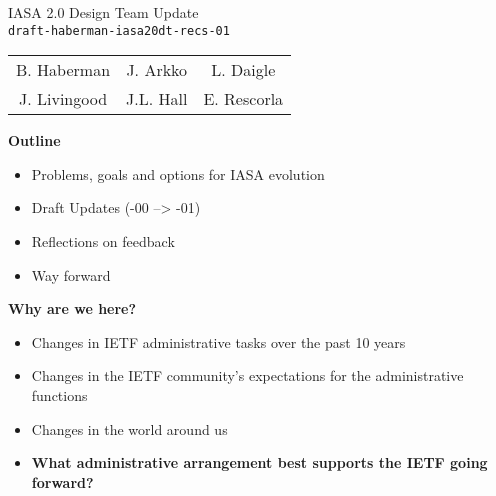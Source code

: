 \documentclass[helvetica,a4paper,landscape]{seminar}
\newcommand{\heading}[1]{%
  \begin{center} 
    \large\bf 
    #1 
  \end{center} 
  \vspace{.4 in}}
\begin{document}
\begin{slide}
\begin{center}
\vspace{.5 in}
\LARGE{{\bf}IASA 2.0 Design Team Update\\{\small \verb^draft-haberman-iasa20dt-recs-01^}}\\
\vspace{.2in}
\large{
\begin{tabular}{ c c c }
B. Haberman & J. Arkko & L. Daigle \\
J. Livingood & J.L. Hall & E. Rescorla 
\end{tabular}
}
\end{center}
\end{slide}

\centerslidesfalse 

\begin{slide}
\heading{Outline}

\begin{itemize}
\item Problems, goals and options for IASA evolution
\item Draft Updates (-00 --> -01)
\item Reflections on feedback
\item Way forward
\end{itemize}

\end{slide}

\begin{slide}

\heading{Why are we here?}

{\footnotesize
\begin{itemize}
\item Changes in IETF administrative tasks over the past 10 years
\item Changes in the IETF community's expectations for the administrative functions
\item Changes in the world around us
\item \textbf{What administrative arrangement best supports the IETF going forward?}
\end{itemize}
}

\end{slide}
\end{document}
